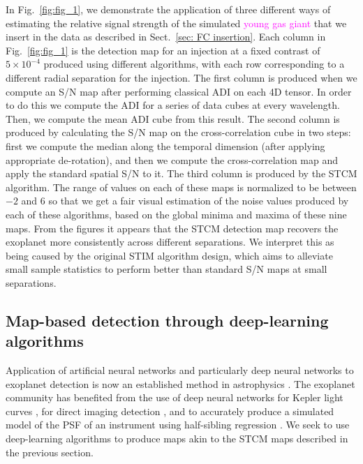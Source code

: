 \documentclass[referee]{aa} %
\newcommand{\newchange}[1]{\textcolor{magenta}{#1}}
\begin{document}
In Fig.~\ref{fig:fig_1}, we demonstrate the application of three different ways of estimating the relative signal strength of the simulated \newchange{young gas giant} that we insert in the data as described in Sect.~\ref{sec: FC insertion}.
Each column in Fig.~\ref{fig:fig_1} is the detection map for an injection at a fixed contrast of $5\times 10^{-4}$ produced using different algorithms, with each row corresponding to a different radial separation for the injection. %
The first column is produced when we compute an S/N map \citep[as defined in][]{2014Mawet} after performing classical ADI on each 4D tensor.
In order to do this we compute the ADI for a series of data cubes at every wavelength. Then, we compute the mean ADI cube from this result. 
The second column is produced by calculating the S/N map \citep[as defined in][]{2014Mawet} on the cross-correlation cube in two steps: first we compute the median along the temporal dimension (after applying appropriate de-rotation), and then we compute the cross-correlation map and apply the standard spatial S/N to it.
The third column is produced by the STCM algorithm.
The range of values on each of these maps is normalized to be between $-2$ and $6$ so that we get a fair visual estimation of the noise values produced by each of these algorithms, based on the global minima and maxima of these nine maps.
From the figures it appears that the STCM detection map recovers the exoplanet more consistently across different separations. We interpret this as being caused by the original STIM algorithm design, which aims to alleviate small sample statistics to perform better than standard S/N maps at small separations.

\subsection{Map-based detection through deep-learning algorithms}\label{sec:ML algorithms}

Application of artificial neural networks and particularly deep neural networks to exoplanet detection is now an established method in astrophysics \citep[][]{2020Fluke}.
The exoplanet community has benefited from the use of deep neural networks for Kepler light curves \citep{2018Pearson}, for direct imaging detection \citep{2018Gomez}, and to accurately produce a simulated model of the PSF of an instrument using half-sibling regression \citep{2022Gebhard}.
We seek to use deep-learning algorithms to produce maps akin to the STCM maps described in the previous section.
\end{document}
